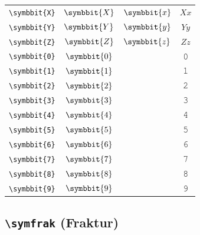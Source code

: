 \documentclass[12pt,a4paper]{article}
\begin{document}
\begin{longtable}{|c|c|c|c|}
\verb|\symbbit{X}| & $\symbbit{X}$ & $\symbbit{x}$ & $ 𝑋 𝑥 $ \\
\verb|\symbbit{Y}| & $\symbbit{Y}$ & $\symbbit{y}$ & $ 𝑌 𝑦 $ \\
\verb|\symbbit{Z}| & $\symbbit{Z}$ & $\symbbit{z}$ & $ 𝑍 𝑧 $ \\
\verb|\symbbit{0}| & $\symbbit{0}$ & & 𝟶 \\
\verb|\symbbit{1}| & $\symbbit{1}$ & & 𝟷 \\
\verb|\symbbit{2}| & $\symbbit{2}$ & & 𝟸 \\
\verb|\symbbit{3}| & $\symbbit{3}$ & & 𝟹 \\
\verb|\symbbit{4}| & $\symbbit{4}$ & & 𝟺 \\
\verb|\symbbit{5}| & $\symbbit{5}$ & & 𝟻 \\
\verb|\symbbit{6}| & $\symbbit{6}$ & & 𝟼 \\
\verb|\symbbit{7}| & $\symbbit{7}$ & & 𝟽 \\
\verb|\symbbit{8}| & $\symbbit{8}$ & & 𝟾 \\
\verb|\symbbit{9}| & $\symbbit{9}$ & & 𝟿 \\
\hline
\end{longtable}

\newpage

\subsection*{\texttt{\textbackslash{}symfrak} (Fraktur)}
\end{document}
